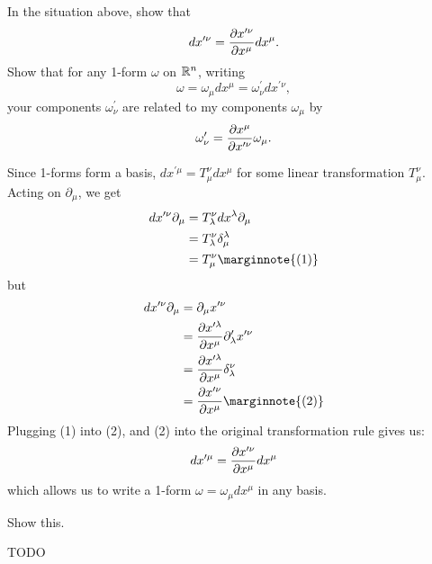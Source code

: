 \documentclass[10pt]{article}
\begin{document}
\begin{example}
	In the situation above, show that
	$$
		dx^{\prime\nu} = \frac{\partial x^{\prime\nu}}{\partial x^\mu}dx^\mu.
	$$
	Show that for any 1-form $\omega$ on $\mathbb{R}^n$, writing
	$$
		\omega = \omega_\mu dx^\mu = \omega_\nu^\prime dx^{\prime\nu},
	$$
	your components $\omega^\prime_\nu$ are related to my components $\omega_\mu$ by
	$$
		\omega^\prime_\nu = \frac{\partial x^{\mu}}{\partial x^{\prime\nu}}\omega_\mu.
	$$
\end{example}
\sol Since 1-forms form a basis, $dx^{\prime\mu}=T^\nu_\mu dx^\mu$ for some linear transformation $T^\nu_\mu$. Acting on $\partial_\mu$, we get
$$
\begin{aligned}
	dx^{\prime\nu}\partial_\mu &= T_\lambda^\nu dx^\lambda \partial_\mu\\
	&= T_\lambda^\nu \delta_\mu^\lambda\\
	&= T_\mu^\nu\marginnote{(1)}
\end{aligned}
$$
but
$$
\begin{aligned}
	dx^{\prime\nu}\partial_\mu &= \partial_\mu x^{\prime\nu}\\
	&= \pd{x^{\prime\lambda}}{x^\mu} \partial_\lambda^\prime x^{\prime\nu}\\
	&= \pd{x^{\prime\lambda}}{x^\mu} \delta_\lambda^\nu\\
	&= \pd{x^{\prime\nu}}{x^\mu}\marginnote{(2)}
\end{aligned}
$$
Plugging (1) into (2), and (2) into the original transformation rule gives us:
$$
dx^{\prime\mu}=\frac{\partial x^{\prime\nu}}{\partial x^\mu} dx^\mu
$$ 
which allows us to write a 1-form $\omega = \omega_\mu dx^\mu$ in any basis.


\begin{example}\label{b1e37}
	Show this.
\end{example}
\sol TODO
\end{document}
